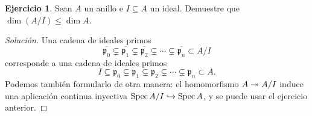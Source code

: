 \documentclass{article}
\theoremstyle{definition}
\newtheorem{ejerc}{Ejercicio}
\newenvironment{solucion}{\begin{proof}[Solución]}{\end{proof}}
\begin{document}
\begin{ejerc}
  Sean $A$ un anillo e $I \subseteq A$ un ideal. Demuestre que
  $\dim (A/I) \le \dim A$.

  \ifdefined\solutions\begin{solucion}
    Una cadena de ideales primos
    \[ \overline{\mathfrak{p}_0} \subsetneq \overline{\mathfrak{p}_1} \subsetneq
       \overline{\mathfrak{p}_2} \subsetneq \cdots \subsetneq
       \overline{\mathfrak{p}_n} \subset A/I \]
    corresponde a una cadena de ideales primos
    \[ I \subseteq \mathfrak{p}_0 \subsetneq \mathfrak{p}_1 \subsetneq
       \mathfrak{p}_2 \subsetneq \cdots \subsetneq \mathfrak{p}_n \subset A. \]
    Podemos también formularlo de otra manera: el homomorfismo $A \twoheadrightarrow A/I$
    induce una aplicación continua inyectiva
    $\operatorname{Spec} A/I \hookrightarrow \operatorname{Spec} A$, y se puede usar el ejercicio anterior.
  \end{solucion}\fi
\end{ejerc}
\end{document}
